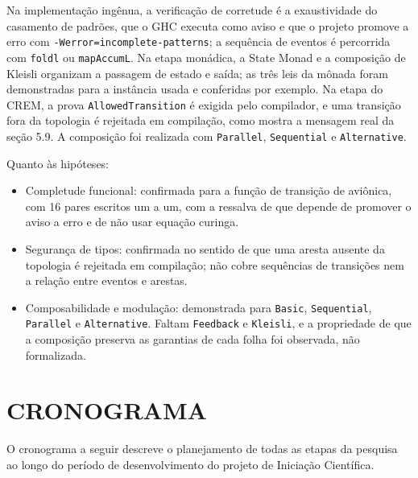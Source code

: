 \documentclass[12pt,a4paper]{article}
\begin{document}
Na implementação ingênua, a verificação de corretude é a exaustividade do casamento de padrões, que o GHC executa como aviso e que o projeto promove a erro com \texttt{-Werror=incomplete-patterns}; a sequência de eventos é percorrida com \texttt{foldl} ou \texttt{mapAccumL}. Na etapa monádica, a State Monad e a composição de Kleisli organizam a passagem de estado e saída; as três leis da mônada foram demonstradas para a instância usada e conferidas por exemplo. Na etapa do CREM, a prova \texttt{AllowedTransition} é exigida pelo compilador, e uma transição fora da topologia é rejeitada em compilação, como mostra a mensagem real da seção 5.9. A composição foi realizada com \texttt{Parallel}, \texttt{Sequential} e \texttt{Alternative}.

Quanto às hipóteses:

\begin{itemize}
\item Completude funcional: confirmada para a função de transição de aviônica, com 16 pares escritos um a um, com a ressalva de que depende de promover o aviso a erro e de não usar equação curinga.
\item Segurança de tipos: confirmada no sentido de que uma aresta ausente da topologia é rejeitada em compilação; não cobre sequências de transições nem a relação entre eventos e arestas.
\item Composabilidade e modulação: demonstrada para \texttt{Basic}, \texttt{Sequential}, \texttt{Parallel} e \texttt{Alternative}. Faltam \texttt{Feedback} e \texttt{Kleisli}, e a propriedade de que a composição preserva as garantias de cada folha foi observada, não formalizada.
\end{itemize}

\section{CRONOGRAMA}

O cronograma a seguir descreve o planejamento de todas as etapas da pesquisa ao longo do período de desenvolvimento do projeto de Iniciação Científica.
\end{document}
